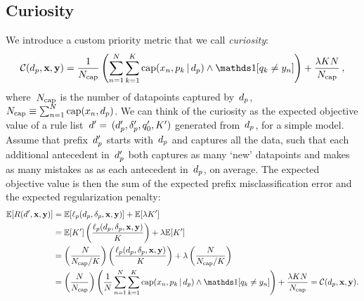 \begin{kdd}
\vspace{-1mm}
\end{kdd}

\begin{arxiv}
\section{Curiosity}

We introduce a custom priority metric that we call \emph{curiosity}:
\begin{align}
\Curiosity(\Prefix, \x, \y) = \frac{1}{\NCap} \left(\sum_{n=1}^N \sum_{k=1}^K
  \Cap(x_n, p_k \given \Prefix) \wedge \one [ q_k \neq y_n ] \right)
  + \frac{\Reg K N}{\NCap} \,,
\end{align}
where~$N_{\textnormal{cap}}$ is the number of datapoints captured by~$d_p$, \ie
${N_{\textnormal{cap}} \equiv \sum_{n=1}^N \textnormal{cap}(x_n, d_p)}$.
%
We can think of the curiosity as the expected objective value
of a rule list~${{d}' = }$ ${(d_p', \delta_p', q_0', K')}$
generated from~$d_p$, for a simple model.
%
Assume that prefix~$d_p'$ starts with~$d_p$ and captures all the data,
such that each additional antecedent in~$d_p'$
both captures as many `new' datapoints and makes as many mistakes as
as each antecedent in~$d_p$, on average.
%
The expected objective value is then the sum of the expected prefix
misclassification error and the expected regularization penalty:
\begin{align}
\E[ \Obj(\RL', \x, \y) ] &= \E[\Loss_p(\Prefix, \Labels, \x, \y)] + \E[ \Reg K' ] \nn \\
&= \E[ K' ] \left(\frac{\Loss_p(\Prefix, \Labels, \x, \y)}{K}\right) + \Reg \E[ K' ] \nn \\
&=  \left(\frac{N}{\NCap / K}\right)
  \left(\frac{\Loss_p(\Prefix, \Labels, \x, \y)}{K}\right)
  + \Reg \left(\frac{N}{\NCap / K}\right) \nn \\
&= \left(\frac{N}{\NCap}\right) \left(\frac{1}{N} \sum_{n=1}^N \sum_{k=1}^K
  \Cap(x_n, p_k \given \Prefix) \wedge \one [ q_k \neq y_n ] \right)
  + \frac{\Reg K N}{\NCap} = \Curiosity(\Prefix, \x, \y).
\end{align}
\end{arxiv}
